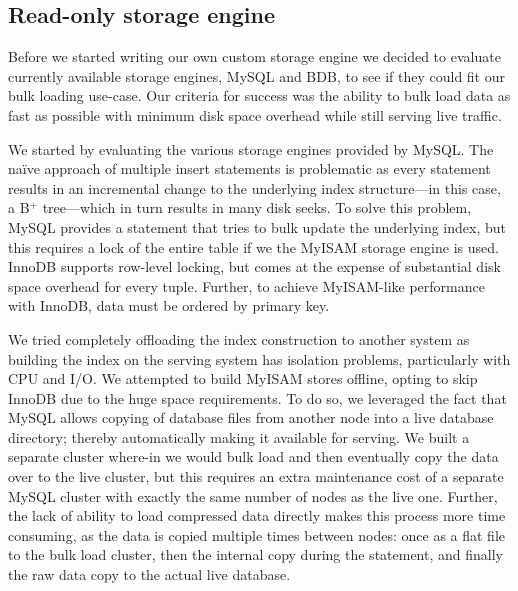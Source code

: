 
\subsection{Read-only storage engine}
\label{sec:read_only}

Before we started writing our own custom storage engine we decided to
evaluate currently available storage engines, MySQL and BDB, to see 
if they could fit our bulk loading use-case. Our criteria for success 
was the ability to bulk load data as fast as possible with minimum 
disk space overhead while still serving live traffic.
 
We started by evaluating the various storage engines provided by
MySQL. The na\"ive approach of multiple insert statements is
problematic as every statement results in an incremental change to the
underlying index structure---in this case, a B$^{+}$ tree---which in
turn results in many disk seeks. To solve this problem, MySQL provides
a  statement that tries to bulk update the underlying
index, but this requires a lock of the entire table if we the MyISAM
storage engine is used. InnoDB supports row-level locking, but comes
at the expense of substantial disk space overhead for every tuple.
Further, to achieve MyISAM-like performance with InnoDB, data must be
ordered by primary key.

We tried completely offloading the index construction to another
system as building the index on the serving system has isolation
problems, particularly with CPU and I/O. We attempted to build MyISAM
stores offline, opting to skip InnoDB due to the huge space
requirements. To do so, we leveraged the fact that MySQL allows
copying of database files from another node into a live database
directory; thereby automatically making it available for serving. We built a
separate cluster where-in we would bulk load and then eventually copy
the data over to the live cluster, but this requires an extra
maintenance cost of a separate MySQL cluster with exactly the same
number of nodes as the live one. Further, the lack of ability to load
compressed data directly makes this process more time consuming, as
the data is copied multiple times between nodes: once as a flat file
to the bulk load cluster, then the internal copy during the 
statement, and finally the raw data copy to the actual live database. 

